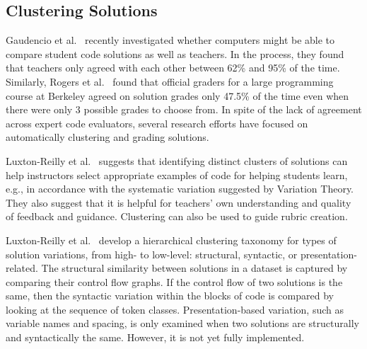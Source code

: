 


\subsection{Clustering Solutions}

Gaudencio et al.~\cite{Gaudencio} recently investigated whether computers might be able to compare student code solutions as well as teachers. In the process, they found that teachers only agreed with each other between 62\% and 95\% of the time. Similarly, Rogers et al.~\cite{ACESthesis} found that official graders for a large programming course at Berkeley agreed on solution grades only 47.5\% of the time even when there were only 3 possible grades to choose from. In spite of the lack of agreement across expert code evaluators, several research efforts have focused on automatically clustering and grading solutions.

Luxton-Reilly et al.~\cite{Luxton13} suggests that identifying distinct clusters of solutions can help instructors select appropriate examples of code for helping students learn, e.g., in accordance with the systematic variation suggested by Variation Theory. They also suggest that it is helpful for teachers' own understanding and quality of feedback and guidance. Clustering can also be used to guide rubric creation.

Luxton-Reilly et al.~\cite{Luxton13} develop a hierarchical clustering taxonomy for types of solution variations, from high- to low-level: structural, syntactic, or presentation-related. The structural similarity between solutions in a dataset is captured by comparing their control flow graphs. If the control flow of two solutions is the same, then the syntactic variation within the blocks of code is compared by looking at the sequence of token classes. Presentation-based variation, such as variable names and spacing, is only examined when two solutions are structurally and syntactically the same. However, it is not yet fully implemented. %

